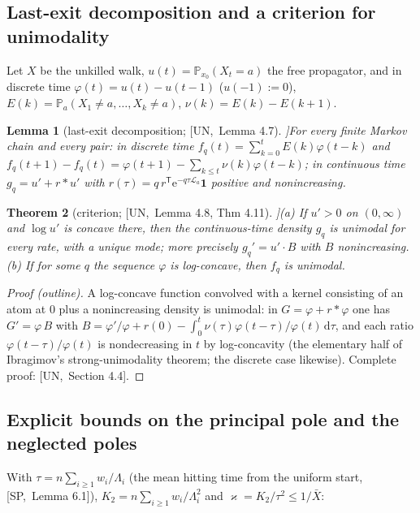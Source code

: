 \documentclass[10pt,a4paper]{article}
\theoremstyle{plain}
\newtheorem{theorem}{Theorem}[section]
\newtheorem{lemma}[theorem]{Lemma}
\theoremstyle{definition}
\newcommand{\src}[2]{[\textsf{#1},~#2]}           %
\newcommand{\SPE}{\textsf{SP}}
\newcommand{\UNI}{\textsf{UN}}
\renewcommand{\P}{\mathbb{P}}
\newcommand{\Lg}{\mathcal{L}}
\newcommand{\ee}{\mathrm{e}}
\newcommand{\dd}{\mathrm{d}}
\newcommand{\Xb}{\bar X}
\begin{document}
\subsection{Last-exit decomposition and a criterion for unimodality}

Let $X$ be the unkilled walk, $u(t)=\P_{x_0}(X_t=a)$ the free propagator, and in discrete time $\varphi(t)=u(t)-u(t-1)$ ($u(-1):=0$), $E(k)=\P_a(X_1\ne a,\dots,X_k\ne a)$, $\nu(k)=E(k)-E(k+1)$.

\begin{lemma}[last-exit decomposition; \src{\UNI}{Lemma 4.7}]\label{lem:lastexit}
For every finite Markov chain and every pair: in discrete time $f_q(t)=\sum_{k=0}^tE(k)\varphi(t-k)$ and $f_q(t+1)-f_q(t)=\varphi(t+1)-\sum_{k\le t}\nu(k)\varphi(t-k)$; in continuous time $g_q=u'+r*u'$ with $r(\tau)=q\,r^{\mathsf T}\ee^{-q\tau\Lg_a}\mathbf 1$ positive and nonincreasing.
\end{lemma}

\begin{theorem}[criterion; \src{\UNI}{Lemma 4.8, Thm 4.11}]\label{thm:criterion}
(a) If $u'>0$ on $(0,\infty)$ and $\log u'$ is concave there, then the continuous-time density $g_q$ is unimodal for every rate, with a unique mode; more precisely $g_q'=u'\cdot B$ with $B$ nonincreasing.
(b) If for some $q$ the sequence $\varphi$ is log-concave, then $f_q$ is unimodal.
\end{theorem}
\begin{proof}[Proof (outline)]
A log-concave function convolved with a kernel consisting of an atom at $0$ plus a nonincreasing density is unimodal: in $G=\varphi+r*\varphi$ one has $G'=\varphi\,B$ with $B=\varphi'/\varphi+r(0)-\int_0^t\nu(\tau)\varphi(t-\tau)/\varphi(t)\,\dd\tau$, and each ratio $\varphi(t-\tau)/\varphi(t)$ is nondecreasing in $t$ by log-concavity (the elementary half of Ibragimov's strong-unimodality theorem; the discrete case likewise). Complete proof: \src{\UNI}{Section 4.4}.
\end{proof}

\subsection{Explicit bounds on the principal pole and the neglected poles}

With $\tau=n\sum_{i\ge1}w_i/\Lambda_i$ (the mean hitting time from the uniform start, \src{\SPE}{Lemma 6.1}), $K_2=n\sum_{i\ge1}w_i/\Lambda_i^2$ and $\varkappa=K_2/\tau^2\le1/\Xb$:
\end{document}
